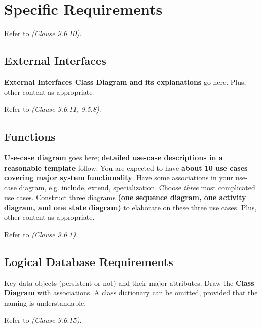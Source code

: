 \chapter{Specific Requirements} \label{specificRequirements}

Refer to \textit{(Clause 9.6.10)}. 

\section{External Interfaces}

\textbf{External Interfaces Class Diagram and its explanations} go here. Plus, other content as appropriate

Refer to \textit{(Clause 9.6.11, 9.5.8)}. 

\section{Functions}

\textbf{Use-case diagram} goes here; \textbf{detailed use-case descriptions in a reasonable template} follow. You are expected to have \textbf{about 10 use cases covering major system functionality}. Have some associations in your use-case diagram, e.g. include, extend, specialization. Choose \textit{three} most complicated use cases. Construct three diagrams \textbf{(one sequence diagram, one activity diagram, and one state diagram)} to elaborate on these three use cases. Plus, other content as appropriate.

Refer to \textit{(Clause 9.6.1)}. 

\section{Logical Database Requirements }
Key data objects (persistent or not) and their major attributes. Draw the \textbf{Class Diagram} with associations. A class dictionary can be omitted, provided that the naming is understandable.

Refer to \textit{(Clause 9.6.15)}.

